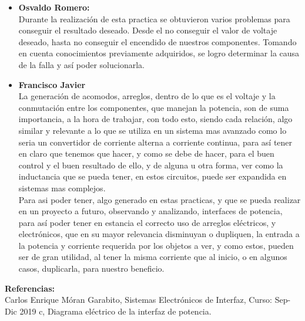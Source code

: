 \documentclass[12pt,letterpaper]{article}
\begin{document}
\begin{itemize}
\item \textbf{Osvaldo Romero:}\\
Durante la realización de esta practica se obtuvieron varios problemas para conseguir el resultado deseado. Desde el no conseguir el valor de voltaje deseado, hasta no conseguir el encendido de nuestros componentes. Tomando en cuenta conocimientos previamente adquiridos, se logro determinar la causa de la falla y así poder solucionarla.
\item \textbf{Francisco Javier}\\
La generación de acomodos, arreglos, dentro de lo que es el voltaje y la conmutación entre los componentes, que manejan la potencia, son de suma importancia, a la hora de trabajar, con todo esto, siendo cada relación, algo similar y relevante a lo que se utiliza en un  sistema mas avanzado como lo seria un convertidor de corriente alterna a corriente continua, para así tener en claro que tenemos que hacer, y como se debe de hacer, para el buen control y el buen resultado de ello, y de alguna u otra forma, ver como la inductancia que se pueda tener, en estos circuitos, puede ser expandida en sistemas mas complejos.\\

Para asi poder tener, algo generado en estas practicas, y que se pueda realizar en un proyecto a futuro, observando y analizando, interfaces de potencia, para así poder tener en estancia el correcto uso de arreglos eléctricos, y electrónicos, que en su mayor relevancia disminuyan o dupliquen, la entrada a la potencia y corriente requerida por los objetos a ver, y como estos, pueden ser de gran utilidad, al tener la misma corriente que al inicio, o en algunos casos, duplicarla, para nuestro beneficio.\\

\end{itemize}


\textbf{\Large Referencias:}\\
Carlos Enrique Móran Garabito, Sistemas Electrónicos de Interfaz, Curso: Sep-Dic 2019 c, Diagrama eléctrico de la interfaz de potencia.
\end{document}
